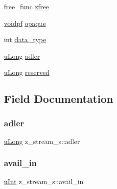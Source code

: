 \begin{DoxyCompactItemize}
\item 
free\+\_\+func \hyperlink{structz__stream__s_a89eb750ade7f4f0b56bfdadf13344982}{zfree}
\item 
\hyperlink{zconf_8h_a04c731495379021454c8e61439dc88ec}{voidpf} \hyperlink{structz__stream__s_ab72467f908d2ce65d5b42ee6556ef8bb}{opaque}
\item 
int \hyperlink{structz__stream__s_a9d8f63877d7639a8bca60f9fc3704fc4}{data\+\_\+type}
\item 
\hyperlink{zconf_8h_acd2a5701a3aecf6700d2c66c606ecb40}{u\+Long} \hyperlink{structz__stream__s_ade2217fe31e671be1257731883201223}{adler}
\item 
\hyperlink{zconf_8h_acd2a5701a3aecf6700d2c66c606ecb40}{u\+Long} \hyperlink{structz__stream__s_add73791dd19b49c9c68f3f3d328c37db}{reserved}
\end{DoxyCompactItemize}


\subsection{Field Documentation}
\mbox{\label{structz__stream__s_ade2217fe31e671be1257731883201223}} 
\subsubsection{\texorpdfstring{adler}{adler}}
{\footnotesize\ttfamily \hyperlink{zconf_8h_acd2a5701a3aecf6700d2c66c606ecb40}{u\+Long} z\+\_\+stream\+\_\+s\+::adler}

\mbox{\label{structz__stream__s_a0cf177f50dbb49692f27480cbcfde794}} 
\subsubsection{\texorpdfstring{avail\+\_\+in}{avail\_in}}
{\footnotesize\ttfamily \hyperlink{zconf_8h_a87d141052bcd5ec8a80812a565c70369}{u\+Int} z\+\_\+stream\+\_\+s\+::avail\+\_\+in}

\mbox{\label{structz__stream__s_a45ad2364307af9d944fd39d4eca3ca3c}} 

